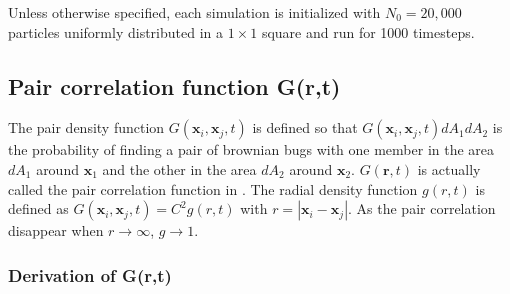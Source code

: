 Unless otherwise specified, each simulation is initialized with $N_0=20,000$ particles uniformly distributed in a $1\times 1$ square and run for 1000 timesteps. 
 
% 
% 
% 
\subsection*{Pair correlation function G(r,t)}

The pair density function $G(\boldsymbol{x}_i,\boldsymbol{x}_j,t)$ is defined so that $G(\boldsymbol{x}_i,\boldsymbol{x}_j,t)dA_1dA_2$ is the probability of finding a pair of brownian bugs with one member in the area $dA_1$ around $\boldsymbol{x}_1$ and the other in the area $dA_2$ around $\boldsymbol{x}_2$. $G(\boldsymbol{r},t)$ is actually called the pair correlation function in \cite{young_reproductive_2001}. The radial density function $g(r,t)$ is defined as $G(\boldsymbol{x}_i,\boldsymbol{x}_j,t)=C^2g(r,t)$ with $r=|\boldsymbol{x}_i-\boldsymbol{x}_j|$. As the pair correlation disappear when $r\rightarrow\infty$, $g\rightarrow 1$. \\

\subsubsection*{Derivation of G(r,t)}

